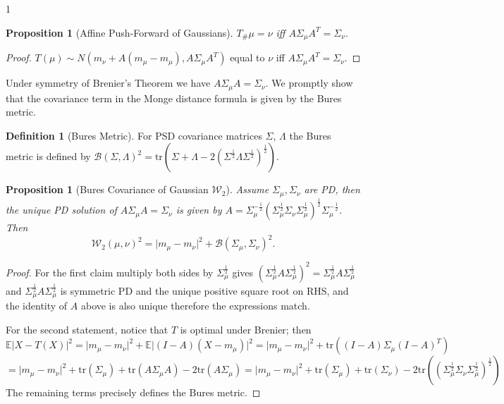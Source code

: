 \documentclass[12pt]{article}
\newtheorem{proposition}[theorem]{Proposition}
\theoremstyle{definition}
\newtheorem{definition}[theorem]{Definition}
\theoremstyle{plain}
\begin{document}
\begin{spacing}{1}
\begin{proposition}[Affine Push-Forward of Gaussians]
    $T_\# \mu = \nu$ iff $A \Sigma_\mu A^T = \Sigma_\nu$.
\end{proposition}

\begin{proof}
    $T(\mu) \sim N(m_\nu + A(m_\mu - m_\mu), A\Sigma_\mu A^T)$ equal to $\nu$ iff $A\Sigma_\mu A^T = \Sigma_\nu$.
\end{proof}

Under symmetry of Brenier's Theorem we have $A\Sigma_\mu A = \Sigma_\nu$. We promptly show that the covariance term in the Monge distance formula is given by the Bures metric.

\begin{definition}[Bures Metric]
    For PSD covariance matrices $\Sigma$, $\Lambda$ the Bures metric is defined by $\mathcal{B}(\Sigma, \Lambda)^2 = \text{tr}(\Sigma + \Lambda - 2(\Sigma^{\frac{1}{2}} \Lambda \Sigma^{\frac{1}{2}})^{\frac{1}{2}})$.
\end{definition}

\begin{proposition}[Bures Covariance of Gaussian $\mathcal{W}_2$]
    Assume $\Sigma_\mu, \Sigma_\nu$ are PD, then the unique PD solution of $A\Sigma_\mu A = \Sigma_\nu$ is given by $A = \Sigma_\mu^{-\frac{1}{2}} (\Sigma_\mu^\frac{1}{2} \Sigma_\nu \Sigma_\mu^\frac{1}{2})^\frac{1}{2} \Sigma_\mu^{-\frac{1}{2}}$. Then 
    \[
    \mathcal{W}_2(\mu, \nu)^2 = \lvert m_\mu - m_\nu \rvert^2 + \mathcal{B}(\Sigma_\mu, \Sigma_\nu)^2.
    \]
\end{proposition}

\begin{proof}
    For the first claim multiply both sides by $\Sigma_\mu^\frac{1}{2}$ gives $(\Sigma_\mu^\frac{1}{2} A \Sigma_\mu^\frac{1}{2})^2 = \Sigma_\mu^\frac{1}{2}A\Sigma_\mu^\frac{1}{2}$ and $\Sigma_\mu^\frac{1}{2}A\Sigma_\mu^\frac{1}{2}$ is symmetric PD and the unique positive square root on RHS, and the identity of $A$ above is also unique therefore the expressions match.
    \newline

    For the second statement, notice that $T$ is optimal under Brenier; then
    \[
    \mathbb{E}\lvert X - T(X) \rvert^2 = \lvert m_\mu - m_\nu \rvert^2 + \mathbb{E} \lvert(I - A)(X - m_\mu) \rvert^2 = \lvert m_\mu - m_\nu \rvert^2 + \text{tr}((I - A)\Sigma_\mu(I - A)^T)
    \]
    \[
    = \lvert m_\mu - m_\nu \rvert^2 + \text{tr}(\Sigma_\mu) + \text{tr}(A \Sigma_\mu A) - 2\text{tr}(A\Sigma_\mu) = \lvert m_\mu - m_\nu \rvert^2 + \text{tr}(\Sigma_\mu) + \text{tr}(\Sigma_\nu) - 2\text{tr}((\Sigma_\mu^\frac{1}{2} \Sigma_\nu \Sigma_\mu^\frac{1}{2})^\frac{1}{2})
    \]
    The remaining terms precisely defines the Bures metric.
\end{proof}


\end{spacing}
\end{document}
